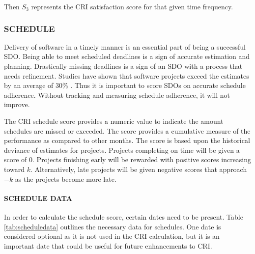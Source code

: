 \documentclass[SDSUThesis.tex]{subfiles}
\begin{document}
                Then $S_3$ represents the CRI satisfaction score for that given time 
                frequency.

        \subsubsection{SCHEDULE}  
            Delivery of software in a timely manner is an essential part of being a 
            successful SDO.  Being able to meet scheduled deadlines is a sign of accurate
            estimation and planning.  Drastically missing deadlines is a sign of an SDO
            with a process that needs refinement.  Studies have shown that 
            software projects exceed the estimates by an average of
            30\% \cite{Jorgensen2014}.  Thus it is important to score SDOs on accurate
            schedule adherence. Without tracking and measuring schedule adherence, it will
            not improve.  
            
            The CRI schedule score provides a numeric value to indicate the amount 
            schedules are missed or exceeded.  The score provides a cumulative measure
            of the performance as compared to other months.
            The score is based upon the historical deviance of estimates for
            projects.  Projects completing on time will be given a score of 0.
            Projects finishing early will be rewarded with positive scores increasing toward
            $k$. Alternatively, 
            late projects will be given negative scores that approach $-k$ as the projects
            become more late. 
            
            \paragraph{SCHEDULE DATA}
            
                In order to calculate the schedule score, certain dates
                need to be present. Table \ref{tab:scheduledata} outlines
                the necessary data for schedules.  One date is considered
                optional as it is not used in the CRI calculation, but it
                is an important date that could be useful for future
                enhancements to CRI.
            
\end{document}
